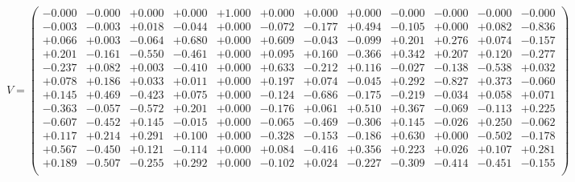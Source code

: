 \documentclass[9pt]{article}
\theoremstyle{plain}
\theoremstyle{definition}
\theoremstyle{remark}
\numberwithin{equation}{section}
\begin{document}
$V = \left(
\begin{array}{
cccccccccccc}
-0.000 & -0.000 & +0.000 & +0.000 & +1.000 & +0.000 & +0.000 & +0.000 & -0.000 & -0.000 & -0.000 & -0.000 \\
-0.003 & -0.003 & +0.018 & -0.044 & +0.000 & -0.072 & -0.177 & +0.494 & -0.105 & +0.000 & +0.082 & -0.836 \\
+0.066 & +0.003 & -0.064 & +0.680 & +0.000 & +0.609 & -0.043 & -0.099 & +0.201 & +0.276 & +0.074 & -0.157 \\
+0.201 & -0.161 & -0.550 & -0.461 & +0.000 & +0.095 & +0.160 & -0.366 & +0.342 & +0.207 & +0.120 & -0.277 \\
-0.237 & +0.082 & +0.003 & -0.410 & +0.000 & +0.633 & -0.212 & +0.116 & -0.027 & -0.138 & -0.538 & +0.032 \\
+0.078 & +0.186 & +0.033 & +0.011 & +0.000 & +0.197 & +0.074 & -0.045 & +0.292 & -0.827 & +0.373 & -0.060 \\
+0.145 & +0.469 & -0.423 & +0.075 & +0.000 & -0.124 & -0.686 & -0.175 & -0.219 & -0.034 & +0.058 & +0.071 \\
-0.363 & -0.057 & -0.572 & +0.201 & +0.000 & -0.176 & +0.061 & +0.510 & +0.367 & -0.069 & -0.113 & +0.225 \\
-0.607 & -0.452 & +0.145 & -0.015 & +0.000 & -0.065 & -0.469 & -0.306 & +0.145 & -0.026 & +0.250 & -0.062 \\
+0.117 & +0.214 & +0.291 & +0.100 & +0.000 & -0.328 & -0.153 & -0.186 & +0.630 & +0.000 & -0.502 & -0.178 \\
+0.567 & -0.450 & +0.121 & -0.114 & +0.000 & +0.084 & -0.416 & +0.356 & +0.223 & +0.026 & +0.107 & +0.281 \\
+0.189 & -0.507 & -0.255 & +0.292 & +0.000 & -0.102 & +0.024 & -0.227 & -0.309 & -0.414 & -0.451 & -0.155 \\
\end{array}
\right)$ \newline 
\end{document}

